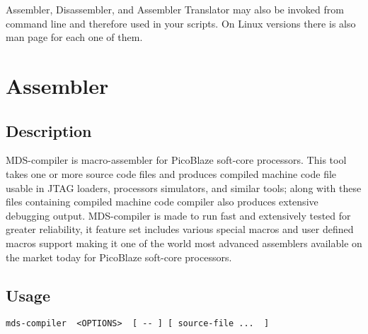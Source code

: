 Assembler, Disassembler, and Assembler Translator may also be invoked from command line and therefore used in your scripts. On Linux versions there is also man page for each one of them.

\section{Assembler}
    \subsection{Description}
        MDS-compiler is macro-assembler for PicoBlaze soft-core processors. This tool takes one or more source code files and produces compiled machine code file usable in JTAG loaders, processors simulators, and similar tools; along with these files containing compiled machine code compiler also produces extensive debugging output. MDS-compiler is made to run fast and extensively tested for greater reliability, it feature set includes various special macros and user defined macros support making it one of the world most advanced assemblers available on the market today for PicoBlaze soft-core processors.\\

    \subsection{Usage}
        \verb'mds-compiler  <OPTIONS>  [ -- ] [ source-file ...  ]'

